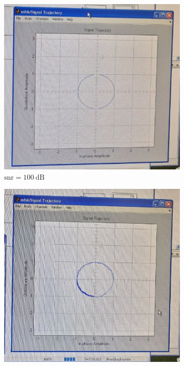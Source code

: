 \documentclass[14pt, a4paper]{article}
\begin{document}
\begin{figure}[H]
\centering
\begin{subfigure}{.5\textwidth}
  \centering
  \includegraphics[width=.95\linewidth]{../images/rt2-9a}
  \caption{$\text{snr}=100\ \text{dB}$}
\end{subfigure}%
\begin{subfigure}{.5\textwidth}
  \centering
  \includegraphics[width=.95\linewidth]{../images/rt2-9b}

\end{subfigure}
\end{figure}
\end{document}
